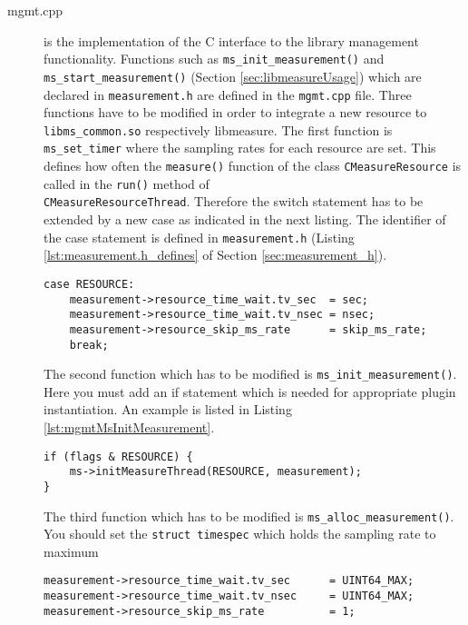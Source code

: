 \begin{description}
\item[mgmt.cpp] is the implementation of the C interface to the library management functionality. Functions such as \texttt{ms\_init\_measurement()} and\\ \texttt{ms\_start\_measurement()} (Section \ref{sec:libmeasureUsage}) which are declared in \texttt{measurement.h} are defined in the \texttt{mgmt.cpp} file. Three functions have to be modified in order to integrate a new resource to \texttt{libms\_common.so} respectively libmeasure. The first function is \texttt{ms\_set\_timer} where the sampling rates for each resource are set. This defines how often the \texttt{measure()} function of the class \texttt{CMeasureResource} is called in the \texttt{run()} method of \\\texttt{CMeasureResourceThread}. Therefore the switch statement has to be extended by a new case as indicated in the next listing. The identifier of the case statement is defined in \texttt{measurement.h} (Listing \ref{lst:measurement.h_defines} of Section \ref{sec:measurement_h}).
\begin{lstlisting}[caption={Code to store resource-specific sampling rates in the \texttt{ms\_set\_timer()} function. \added[id=ck]{Listing aktualisiert}}, label=lst:mgmt]
case RESOURCE:
	measurement->resource_time_wait.tv_sec	= sec;
	measurement->resource_time_wait.tv_nsec	= nsec;
	measurement->resource_skip_ms_rate  	= skip_ms_rate;
	break;
\end{lstlisting}
The second function which has to be modified is \texttt{ms\_init\_measurement()}. Here you must add an if statement which is needed for appropriate plugin instantiation. An example is listed in Listing \ref{lst:mgmtMsInitMeasurement}.
\begin{lstlisting}[caption={Extension of the \texttt{ms\_init\_measurement()} function.}, label=lst:mgmtMsInitMeasurement]
if (flags & RESOURCE) {
	ms->initMeasureThread(RESOURCE, measurement);
}
\end{lstlisting}

The third function which has to be modified is \texttt{ms\_alloc\_measurement()}. You should set the \texttt{struct timespec} which holds the sampling rate to maximum  
\begin{lstlisting}[caption={Extension of the \texttt{ms\_alloc\_measurement()} function.}, label=lst:AlloctoMaxInteger]
measurement->resource_time_wait.tv_sec		= UINT64_MAX;
measurement->resource_time_wait.tv_nsec		= UINT64_MAX;
measurement->resource_skip_ms_rate			= 1;
\end{lstlisting}
\end{description}

